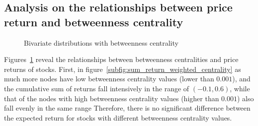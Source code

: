 \subsection{Analysis on the relationships between price return and betweenness centrality}
\begin{figure}
	\hfill%
	\caption{Bivariate distributions with betweenness centrality} \label{fig:bivariate}
\end{figure}

Figures~\ref{fig:bivariate} reveal the relationships between betweenness centralities and price returns of stocks. First, in figure~\ref{subfig:sum_return_weighted_centrality} as much more nodes have low betweenness centrality values (lower than $0.001$), and the cumulative sum of returns fall intensively in the range of $(-0.1, 0.6)$, while that of the nodes with high betweenness centrality values (higher than $0.001$) also fall evenly in the same range Therefore, there is no significant difference between the expected return for stocks with different betweenness centrality values.

